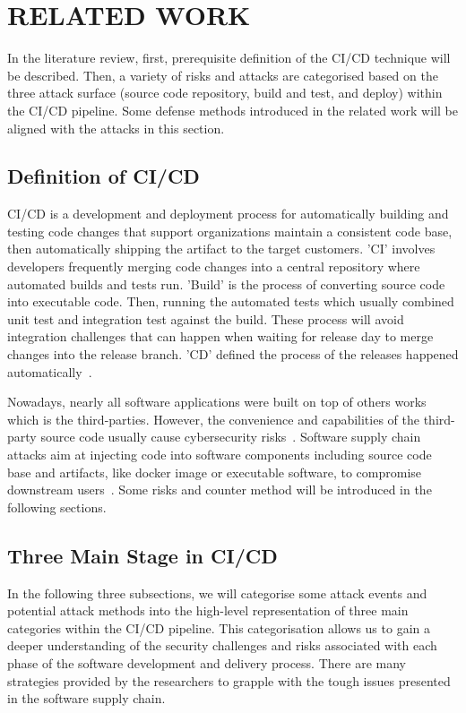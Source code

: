 \section{RELATED WORK}
In the literature review, first, prerequisite definition of the CI/CD technique will be 
described. Then, a variety of risks and attacks are categorised based on the three attack 
surface (source code repository, build and test, and deploy) within the CI/CD pipeline.
Some defense methods introduced in the related work will be aligned with the attacks in this 
section. 

\subsection{Definition of CI/CD}
CI/CD is a development and deployment process for automatically building and testing code
changes that support organizations maintain a consistent code base, then automatically shipping 
the artifact to the target customers. 'CI' involves developers frequently merging code changes 
into a central repository where automated builds and tests run. 'Build' is the process of 
converting source code into executable code. Then, running the automated tests which usually 
combined unit test and integration test against the build. These process will avoid integration 
challenges that can happen when waiting for release day to merge changes into the release branch. 
'CD' defined the process of the releases happened automatically~\cite{DoDDefCI/CD2023}. 

Nowadays, nearly all software applications were built on top of others works which is the third-parties.
However, the convenience and capabilities of the third-party source code usually cause cybersecurity 
risks~\cite{mastrangelo2015use}. Software supply chain attacks aim at injecting code into software
components including source code base and artifacts, like docker image or executable software,
to compromise downstream users~\cite{ladisa2023sok, OWASP2023}. 
Some risks and counter method will be introduced in the following sections.

\subsection{Three Main Stage in CI/CD}
In the following three subsections, 
we will categorise some attack events and potential attack methods into the high-level representation 
of three main categories within the CI/CD pipeline. This categorisation allows us to gain a deeper understanding of 
the security challenges and risks associated with each phase of the software development and delivery process.
There are many strategies provided by the researchers to grapple with the tough issues presented in the software 
supply chain. 

